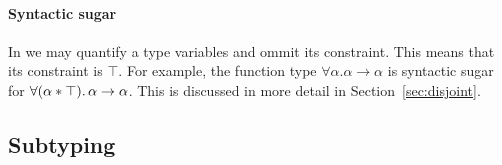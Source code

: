 \paragraph{Syntactic sugar}
In \name we may quantify a type variables and ommit its constraint. 
This means that its constraint is $\top$. 
For example, the function type $\forall \alpha. \alpha \to \alpha$ is syntactic sugar
for  $\forall (\alpha * \top).\, \alpha \to \alpha$.
This is discussed in more detail in Section~\ref{sec:disjoint}. 


\subsection{Subtyping}


%
%
%

